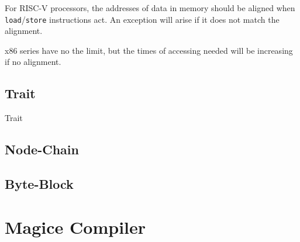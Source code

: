 For RISC-V processors, the addresses of data in memory should be aligned when \texttt{load}/\texttt{store} instructions act. An exception will arise if it does not match the alignment.

x86 series have no the limit, but the times of accessing needed will be increasing if no alignment.



\subsection{Trait}

{Trait}



\subsection{Node-Chain}





\subsection{Byte-Block}





\section{Magice Compiler}



